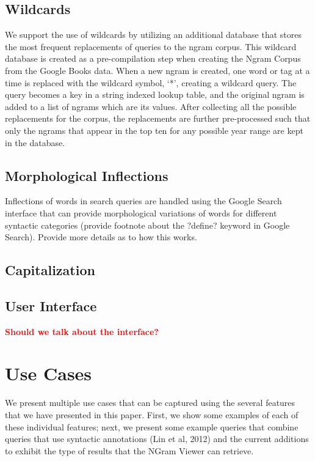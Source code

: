 \documentclass[11pt]{article}
\begin{document}
\subsection{Wildcards}
We support the use of wildcards by utilizing an additional database that stores the most frequent replacements of queries to the ngram corpus. This wildcard database is created as a pre-compilation step when creating the Ngram Corpus from the Google Books data. When a new ngram is created, one word or tag at a time is replaced with the wildcard symbol, `*', creating a wildcard query. The query becomes a key in a string indexed lookup table, and the original ngram is added to a list of ngrams which are its values. After collecting all the possible replacements for the corpus, the replacements are further pre-processed such that only the ngrams that appear in the top ten for any possible year range are kept in the database.

\subsection{Morphological Inflections}
Inflections of words in search queries are handled using the Google Search interface that can provide morphological variations of words for different syntactic categories (provide footnote about the ?define? keyword in Google Search). Provide more details as to how this works.

\subsection{Capitalization}

\subsection{User Interface}
\textcolor{red}{\bf Should we talk about the interface?}


\section{Use Cases}
\label{sec:usecases}
We present multiple use cases that can be captured using the several features that we have presented in this paper. First, we show some examples of each of these individual features; next, we present some example queries that combine queries that use syntactic annotations (Lin et al, 2012) and the current additions to exhibit the type of results that the NGram Viewer can retrieve.
\end{document}
